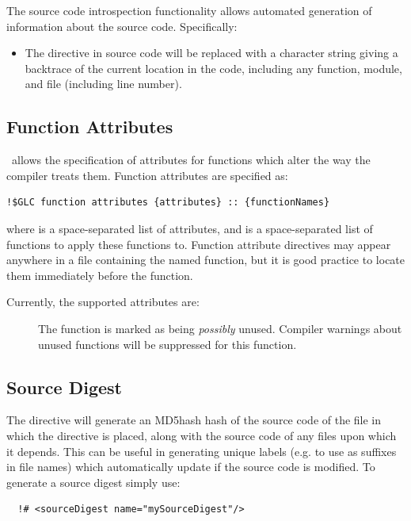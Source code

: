 The source code introspection functionality allows automated generation of information about the source code. Specifically:
\begin{itemize}
\item The directive  in source code will be replaced with a character string giving a backtrace of the current location in the code, including any function, module, and file (including line number).
\end{itemize}

\subsection{Function Attributes}

\glc\ allows the specification of attributes for functions which alter the way the compiler treats them. Function attributes are specified as:
\begin{verbatim}
!$GLC function attributes {attributes} :: {functionNames}
\end{verbatim}
where  is a space-separated list of attributes, and  is a space-separated list of functions to apply these functions to. Function attribute directives may appear anywhere in a file containing the named function, but it is good practice to locate them immediately before the function.

Currently, the supported attributes are:
\begin{description}
\item[] The function is marked as being \emph{possibly} unused. Compiler warnings about unused functions will be suppressed for this function.
\end{description}

\subsection{Source Digest}

The  directive will generate an \gls{MD5hash} hash of the source code of the file in which the directive is placed, along with the source code of any files upon which it depends. This can be useful in generating unique labels (e.g. to use as suffixes in file names) which automatically update if the source code is modified. To generate a source digest simply use:

\begin{lstlisting}
  !# <sourceDigest name="mySourceDigest"/>
\end{lstlisting}

